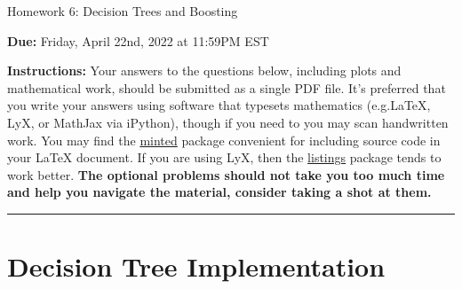 \documentclass{article}
\newcommand{\ruleskip}{\bigskip\hrule\bigskip}
\theoremstyle{plain}
\theoremstyle{definition}
\begin{document}

\pagestyle{myheadings} 

\begin{center}
{\Large
Homework 6: Decision Trees and Boosting
} 
\end{center}

{
{ \color{nyupurple} \textbf{Due:} Friday, April 22nd, 2022 at 11:59PM EST} 
} 

\textbf{Instructions: }Your answers to the questions below, including plots and mathematical work, should be submitted as a single PDF file.  It's preferred that you write your answers using software that typesets mathematics (e.g.LaTeX, LyX, or MathJax via iPython), though if you need to you may scan handwritten work.  You may find the \href{https://github.com/gpoore/minted}{minted} package convenient for including source code in your LaTeX document.  If you are using LyX, then the \href{https://en.wikibooks.org/wiki/LaTeX/Source_Code_Listings}{listings} package tends to work better. {\bf The optional problems should not take you too much time and help you navigate the material, consider taking a shot at them.}

\ruleskip




\section{Decision Tree Implementation}
\end{document}
